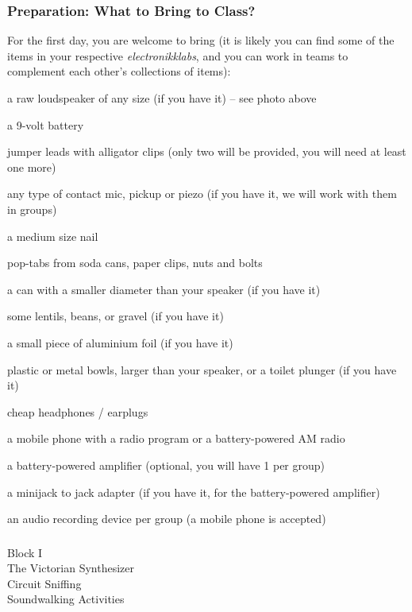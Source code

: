 \documentclass[screen, aspectratio=169]{beamer}
\begin{document}
\begin{frame}
  \frametitle{Preparation: What to Bring to Class?}
  For the first day, you are welcome to bring (it is likely you can find some of the items in your respective \emph{electronikklabs}, and you can work in teams to complement each other's collections of items):
        \begin{itemize}
	{\tiny 	
	\item a raw loudspeaker of any size (if you have it) -- see photo above
	\item a 9-volt battery
	\item jumper leads with alligator clips (only two will be provided, you will need at least one more)
	\item any type of contact mic, pickup or piezo (if you have it, we will work with them in groups)
	\item a medium size nail
	\item pop-tabs from soda cans, paper clips, nuts and bolts
	\item a can with a smaller diameter than your speaker (if you have it)
	\item some lentils, beans, or gravel (if you have it)
	\item a small piece of aluminium foil (if you have it)
	\item plastic or metal bowls, larger than your speaker, or a toilet plunger (if you have it)
	\item cheap headphones / earplugs
	\item a mobile phone with a radio program or a battery-powered AM radio
	\item a battery-powered amplifier (optional, you will have 1 per group)
	\item a minijack to jack adapter (if you have it, for the battery-powered amplifier)
	\item an audio recording device per group (a mobile phone is accepted)
	}
         \end{itemize}
\end{frame}
%

\usebackgroundtemplate{}
\begin{frame}
\frametitle{}
{\huge Block I\\ The Victorian Synthesizer\\ Circuit Sniffing\\ Soundwalking Activities}
\end{frame}
\end{document}
